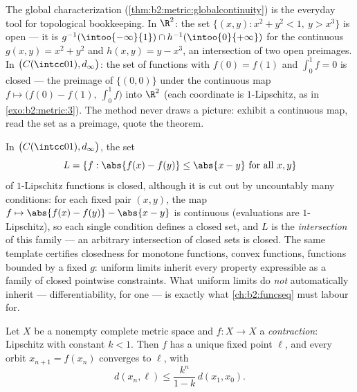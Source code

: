 \begin{example}\label{ex:b2:metric:recognize}
The global characterization
(\cref{thm:b2:metric:globalcontinuity}) is the everyday tool for
topological bookkeeping. In $\R^2$: the set $\{(x, y) : x^2 + y^2
< 1,\ y > x^3\}$ is open --- it is $g^{-1}(\intoo{-\infty}{1})
\cap h^{-1}(\intoo{0}{+\infty})$ for the continuous $g(x,y) =
x^2 + y^2$ and $h(x, y) = y - x^3$, an intersection of two open
preimages. In $\bigl(C(\intcc01), d_\infty\bigr)$: the set of
functions with $f(0) = f(1)$ and $\int_0^1 f = 0$ is closed ---
the preimage of $\{(0,0)\}$ under the continuous map $f \mapsto
\bigl(f(0) - f(1),\ \int_0^1 f\bigr)$ into $\R^2$ (each
coordinate is $1$-Lipschitz, as in \cref{exo:b2:metric:3}). The
method never draws a picture: exhibit a continuous map, read the
set as a preimage, quote the theorem.
\end{example}

\begin{example}\label{ex:b2:metric:lipclosed}
In $\bigl(C(\intcc01), d_\infty\bigr)$, the set
\[
L = \{f : \abs{f(x) - f(y)} \leq \abs{x - y}
\ \text{for all } x, y\}
\]
of $1$-Lipschitz functions is closed, although it is cut out by
uncountably many conditions: for each fixed pair $(x, y)$, the
map $f \mapsto \abs{f(x) - f(y)} - \abs{x - y}$ is continuous
(evaluations are $1$-Lipschitz), so each single condition
defines a closed set, and $L$ is the \emph{intersection} of
this family --- an arbitrary intersection of closed sets is
closed. The same template certifies closedness for monotone
functions, convex functions, functions bounded by a fixed $g$:
uniform limits inherit every property expressible as a family
of closed pointwise constraints. What uniform limits do
\emph{not} automatically inherit --- differentiability, for
one --- is exactly what \cref{ch:b2:funcseq} must labour for.
\end{example}

\begin{theorem}\label{thm:b2:metric:banach}
Let $X$ be a nonempty complete metric space and $f \colon X \to X$ a
\emph{contraction}: Lipschitz with constant $k < 1$. Then $f$ has a
unique fixed point $\ell$, and every orbit $x_{n+1} = f(x_n)$
converges to $\ell$, with
\[
d(x_n, \ell) \leq \frac{k^n}{1 - k}\, d(x_1, x_0) .
\]
\end{theorem}

